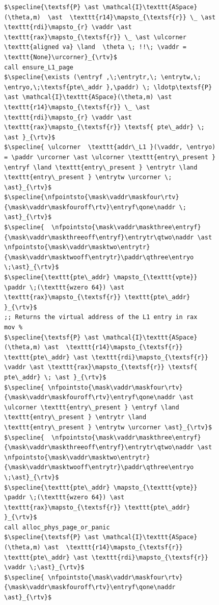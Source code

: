 \documentclass[acmsmall,screen,nonacm]{acmart}
\newcommand{\naddr}{\kw{a}}
\newcommand{\vaddr}{\kw{va}}
\newcommand{\nfpointsto}[5]{#1\sim#2 \mapsto_{#5}\{#4\}\;#3}
\newcommand{\maskfour}{\textsf{l4M52}}
\newcommand{\maskfouroff}{\textsf{l4off}}
\newcommand{\maskthree}{\textsf{l3M52}}
\newcommand{\maskthreeoff}{\textsf{l3off}}
\newcommand{\masktwo}{\textsf{l2M52}}
\newcommand{\masktwooff}{\textsf{l2off}}
\newcommand{\mask}[3]{(#2\; #1 \; #3)}
\newcommand{\entryf}{\textsf{l4e}}
\newcommand{\entrytr}{\textsf{l3e}}
\newcommand{\entrytw}{\textsf{l2e}}
\newcommand{\entryo}{\textsf{l1e}}
\newcommand{\paddr}{\textsf{pa}}
\newcommand{\kw}[1]{\mathsf{#1}}
\begin{document}
\begin{figure}\footnotesize
  \begin{lstlisting}
$\specline{\textsf{P} \ast \mathcal{I}\texttt{ASpace}(\theta,m)  \ast  \texttt{r14}\mapsto_{\textsf{r}} \_ \ast \texttt{rdi}\mapsto_{r} \vaddr \ast \texttt{rax}\mapsto_{\textsf{r}} \_ \ast \ulcorner \texttt{aligned va} \land  \theta \; !!\; \vaddr = \texttt{None}\urcorner}_{\rtv}$
call ensure_L1_page
$\specline{\exists (\entryf ,\;\entrytr,\; \entrytw,\; \entryo,\;\textsf{pte\_addr },\paddr) \; \ldotp\textsf{P} \ast \mathcal{I}\texttt{ASpace}(\theta,m) \ast  \texttt{r14}\mapsto_{\textsf{r}} \_ \ast \texttt{rdi}\mapsto_{r} \vaddr \ast \texttt{rax}\mapsto_{\textsf{r}} \textsf{ pte\_addr} \; \ast }_{\rtv}$
$\specline{ \ulcorner  \texttt{addr\_L1 }(\vaddr, \entryo) = \paddr \urcorner \ast \ulcorner \texttt{entry\_present } \entryf \land \texttt{entry\_present } \entrytr \land  \texttt{entry\_present } \entrytw \urcorner \; \ast}_{\rtv}$
$\specline{\nfpointsto{\mask\vaddr\maskfour\rtv}{\mask\vaddr\maskfouroff\rtv}\entryf\qone\naddr \; \ast}_{\rtv}$ 
$\specline{  \nfpointsto{\mask\vaddr\maskthree\entryf}{\mask\vaddr\maskthreeoff\entryf}\entrytr\qtwo\naddr \ast \nfpointsto{\mask\vaddr\masktwo\entrytr}{\mask\vaddr\masktwooff\entrytr}\paddr\qthree\entryo \;\ast}_{\rtv}$
$\specline{\texttt{pte\_addr} \mapsto_{\texttt{vpte}} \paddr \;(\texttt{wzero 64}) \ast \texttt{rax}\mapsto_{\textsf{r}} \texttt{pte\_addr}  }_{\rtv}$
;; Returns the virtual address of the L1 entry in rax
mov %
$\specline{\textsf{P} \ast \mathcal{I}\texttt{ASpace}(\theta,m) \ast  \texttt{r14}\mapsto_{\textsf{r}} \texttt{pte\_addr} \ast \texttt{rdi}\mapsto_{\textsf{r}} \vaddr \ast \texttt{rax}\mapsto_{\textsf{r}} \textsf{ pte\_addr} \; \ast }_{\rtv}$
$\specline{ \nfpointsto{\mask\vaddr\maskfour\rtv}{\mask\vaddr\maskfouroff\rtv}\entryf\qone\naddr \ast \ulcorner \texttt{entry\_present } \entryf \land \texttt{entry\_present } \entrytr \land  \texttt{entry\_present } \entrytw \urcorner \ast}_{\rtv}$ 
$\specline{  \nfpointsto{\mask\vaddr\maskthree\entryf}{\mask\vaddr\maskthreeoff\entryf}\entrytr\qtwo\naddr \ast \nfpointsto{\mask\vaddr\masktwo\entrytr}{\mask\vaddr\masktwooff\entrytr}\paddr\qthree\entryo \;\ast}_{\rtv}$
$\specline{\texttt{pte\_addr} \mapsto_{\texttt{vpte}} \paddr \;(\texttt{wzero 64}) \ast \texttt{rax}\mapsto_{\textsf{r}} \texttt{pte\_addr}  }_{\rtv}$
call alloc_phys_page_or_panic
$\specline{\textsf{P} \ast \mathcal{I}\texttt{ASpace}(\theta,m) \ast  \texttt{r14}\mapsto_{\textsf{r}} \texttt{pte\_addr} \ast \texttt{rdi}\mapsto_{\textsf{r}} \vaddr \;\ast}_{\rtv}$
$\specline{ \nfpointsto{\mask\vaddr\maskfour\rtv}{\mask\vaddr\maskfouroff\rtv}\entryf\qone\naddr \ast}_{\rtv}$ 

\end{lstlisting}
\end{figure}
\end{document}
